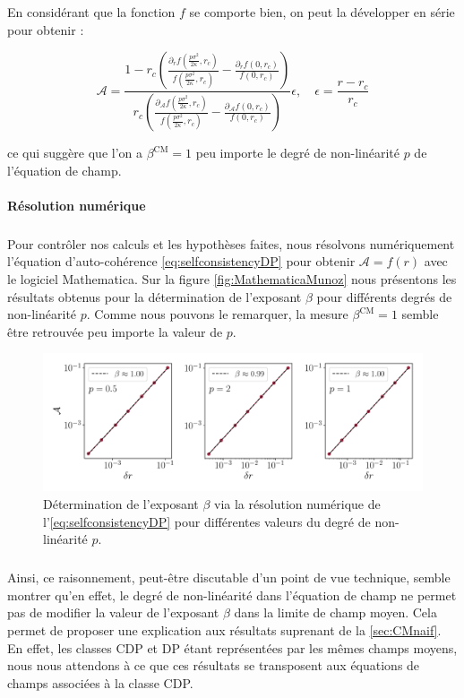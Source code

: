 \noindent En considérant que la fonction $f$ se comporte bien, on peut la développer en série pour obtenir : 

\begin{equation}
    \mathcal{A} = \frac{1-r_c\left( \frac{\partial_r f(\frac{p\sigma^2}{2\kappa},r_c)}{f(\frac{p\sigma^2}{2\kappa},r_c)}- \frac{\partial_rf(0,r_c)}{f(0,r_c)} \right)}{r_c\left( \frac{\partial_\mathcal{A} f(\frac{p\sigma^2}{2\kappa},r_c)}{f(\frac{p\sigma^2}{2\kappa},r_c)}- \frac{\partial_\mathcal{A} f(0,r_c)}{f(0,r_c)} \right)}\epsilon,\quad \epsilon = \frac{r-r_c}{r_c}
\end{equation}

\noindent ce qui suggère que l'on a $\beta^\text{CM} = 1$ peu importe le degré de non-linéarité $p$ de l'équation de champ.

\paragraph{Résolution numérique}

\subparagraph{}Pour contrôler nos calculs et les hypothèses faites, nous résolvons numériquement l'équation d'auto-cohérence \autoref{eq:selfconsistencyDP} pour obtenir $\mathcal{A} = f(r)$ avec le logiciel Mathematica. Sur la figure \autoref{fig:MathematicaMunoz} nous présentons les résultats obtenus pour la détermination de l'exposant $\beta$ pour différents degrés de non-linéarité $p$. Comme nous pouvons le remarquer, la mesure $\beta^\text{CM}=1$ semble être retrouvée peu importe la valeur de $p$.

\begin{figure}[h]
	\centering
	\includegraphics[width=\textwidth]{Chapitre6/Figures/MathematicaMunozDP.pdf}
	\caption{Détermination de l'exposant $\beta$ via la résolution numérique de l'\autoref{eq:selfconsistencyDP} pour différentes valeurs du degré de non-linéarité $p$.}
	\label{fig:MathematicaMunoz}
\end{figure}

\subparagraph{}Ainsi, ce raisonnement, peut-être discutable d'un point de vue technique, semble montrer qu'en effet, le degré de non-linéarité dans l'équation de champ ne permet pas de modifier la valeur de l'exposant $\beta$ dans la limite de champ moyen. Cela permet de proposer une explication aux résultats suprenant de la \autoref{sec:CMnaif}. En effet, les classes CDP et DP étant représentées par les mêmes champs moyens, nous nous attendons à ce que ces résultats se transposent aux équations de champs associées à la classe CDP.

